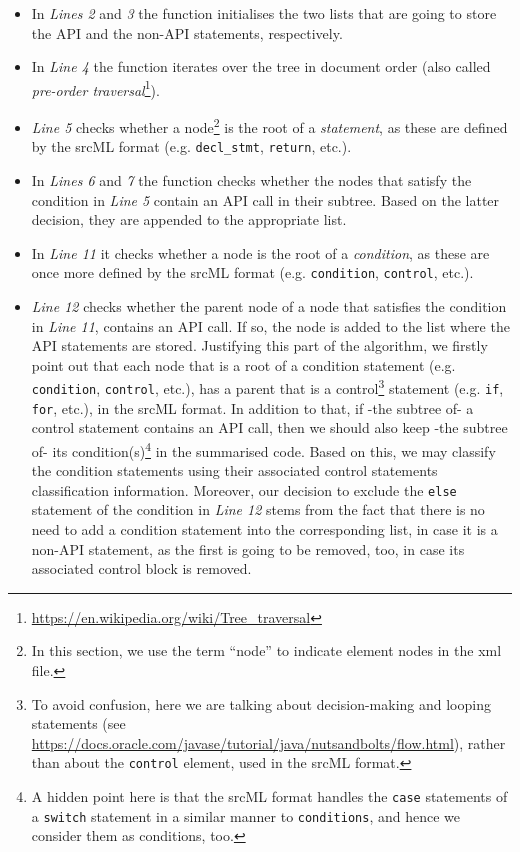 \begin{itemize}
\item In \textit{Lines 2} and \textit{3} the function initialises the two lists that are going to store the API and the non-API statements, respectively.
\item In \textit{Line 4} the function iterates over the tree in document order (also called \textit{pre-order traversal}\footnote{\url{https://en.wikipedia.org/wiki/Tree_traversal}}).
\item \textit{Line 5} checks whether a node\footnote{In this section, we use the term ``node'' to indicate element nodes in the xml file.} is the root of a \textit{statement}, as these are defined by the srcML format (e.g. \texttt{decl\_stmt}, \texttt{return}, etc.).
\item In \textit{Lines 6} and \textit{7} the function checks whether the nodes that satisfy the condition in \textit{Line 5} contain an API call in their subtree. Based on the latter decision, they are appended to the appropriate list.
\item In \textit{Line 11} it checks whether a node is the root of a \textit{condition}, as these are once more defined by the srcML format (e.g. \texttt{condition}, \texttt{control}, etc.).
\item \textit{Line 12} checks whether the parent node of a node that satisfies the condition in \textit{Line 11}, contains an API call. If so, the node is added to the list where the API statements are stored. Justifying this part of the algorithm, we firstly point out that each node that is a root of a condition statement (e.g. \texttt{condition}, \texttt{control}, etc.), has a parent that is a control\footnote{To avoid confusion, here we are talking about decision-making and looping statements (see \url{https://docs.oracle.com/javase/tutorial/java/nutsandbolts/flow.html}), rather than about the \texttt{control} element, used in the srcML format.} statement (e.g. \texttt{if}, \texttt{for}, etc.), in the srcML format. In addition to that, if -the subtree of- a control statement contains an API call, then we should also keep -the subtree of- its condition(s)\footnote{A hidden point here is that the srcML format handles the \texttt{case} statements of a \texttt{switch} statement in a similar manner to \texttt{conditions}, and hence we consider them as conditions, too.} in the summarised code. Based on this, we may classify the condition statements using their associated control statements classification information. Moreover, our decision to exclude the \texttt{else} statement of the condition in \textit{Line 12} stems from the fact that there is no need to add a condition statement into the corresponding list, in case it is a non-API statement, as the first is going to be removed, too, in case its associated control block is removed.

\end{itemize}
